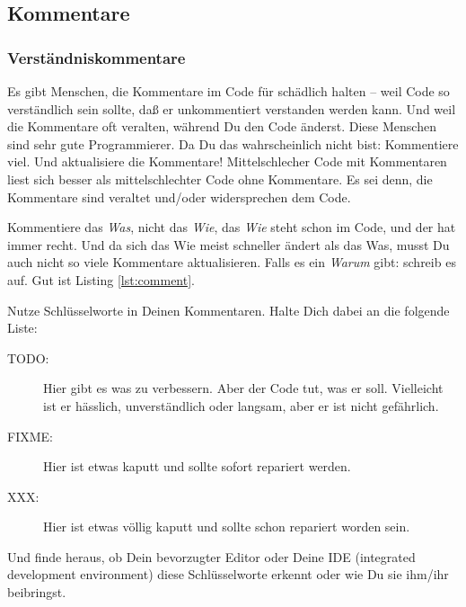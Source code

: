 \documentclass[twoside]{scrartcl}
\begin{document}
\subsection{Kommentare}
\subsubsection{Verst\"a{}ndniskommentare\label{sec:compcom}}
Es gibt Menschen, die Kommentare im Code f\"u{}r sch\"a{}dlich halten -- weil 
Code so verst\"a{}ndlich sein sollte, da\ss{} er unkommentiert verstanden
werden kann.
Und weil die Kommentare oft veralten, w\"a{}hrend Du den Code \"a{}nderst.
Diese Menschen sind sehr gute Programmierer.
Da Du das wahrscheinlich nicht bist:
Kommentiere viel. Und aktualisiere die Kommentare! 
Mittelschlecher Code mit Kommentaren liest sich besser als mittelschlechter  
Code ohne Kommentare. Es sei denn, die Kommentare sind veraltet und/oder 
widersprechen dem Code.

Kommentiere das \emph{Was}, nicht das \emph{Wie}, das \emph{Wie} steht schon im 
Code, und der hat immer recht.
Und da sich das Wie meist schneller \"a{}ndert als das Was, musst Du auch
nicht so viele Kommentare aktualisieren.
Falls es ein \emph{Warum} gibt: schreib es auf. 
Gut ist  Listing \ref{lst:comment}.


Nutze Schl\"u{}sselworte in Deinen Kommentaren. Halte Dich dabei an die folgende
Liste:
\begin{description}
\item[TODO:] Hier gibt es was zu verbessern. Aber der Code tut, was er soll.
  Vielleicht ist er h\"a{}sslich, unverst\"a{}ndlich oder langsam,
  aber er ist nicht gef\"a{}hrlich.
\item[FIXME:] Hier ist etwas kaputt und sollte sofort repariert werden.
\item[XXX:] Hier ist etwas v\"o{}llig kaputt und sollte schon repariert
  worden sein.
\end{description}
Und finde heraus, ob Dein bevorzugter Editor oder Deine IDE (integrated
development environment) diese Schl\"u{}sselworte erkennt oder wie Du sie
ihm/ihr beibringst.
\end{document}
